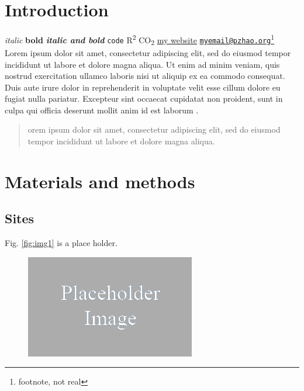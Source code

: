 \documentclass[fontsize=11pt, %
                             paper=a4, %
                             twoside, %
                             captions=tableheading,
                             index=totoc,
                             hyperref]{labbook}
\theoremstyle{definition}
\theoremstyle{definition}
\theoremstyle{remark}
\begin{document}
\begin{addmargin}[4cm]{0cm} %

\pagestyle{scrheadings} %


\chapter{Introduction}\label{introduction}

\emph{italic} \textbf{bold} \textbf{\emph{italic and bold}}
\texttt{code} R\textsuperscript{2} CO\textsubscript{2}
\href{http://pzhao.org}{my website}
\href{mailto:myemail@pzhao.org}{\nolinkurl{myemail@pzhao.org}}\footnote{footnote,
  not real} \citet{R-base} Lorem ipsum dolor sit amet, consectetur
adipiscing elit, sed do eiusmod tempor incididunt ut labore et dolore
magna aliqua. Ut enim ad minim veniam, quis nostrud exercitation ullamco
laboris nisi ut aliquip ex ea commodo consequat. Duis aute irure dolor
in reprehenderit in voluptate velit esse cillum dolore eu fugiat nulla
pariatur. Excepteur sint occaecat cupidatat non proident, sunt in culpa
qui officia deserunt mollit anim id est laborum \citet{R-bookdown}.

\begin{quote}
orem ipsum dolor sit amet, consectetur adipiscing elit, sed do eiusmod
tempor incididunt ut labore et dolore magna aliqua.
\end{quote}

\chapter{Materials and methods}\label{materials-and-methods}

\section{Sites}\label{sites}

Fig. \ref{fig:img1} is a place holder.

\begin{figure}

{\centering \includegraphics[width=0.8\linewidth]{images/img} 

}
\end{figure}
\end{addmargin}
\end{document}
